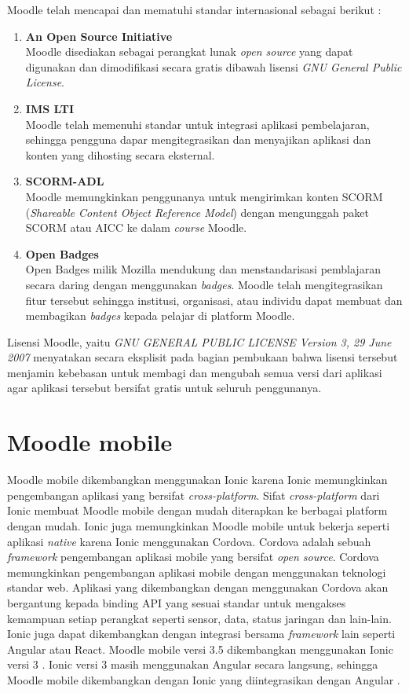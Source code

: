 Moodle telah mencapai dan mematuhi standar internasional sebagai berikut : \cite{moodle:standards}
		\begin{enumerate}
			\item \textbf{An Open Source Initiative} \\
				Moodle disediakan sebagai perangkat lunak \textit{open source} yang dapat digunakan dan dimodifikasi secara gratis dibawah lisensi \textit{GNU General Public License}.
			\item \textbf{IMS LTI\texttrademark} \\
				Moodle telah memenuhi standar untuk integrasi aplikasi pembelajaran, sehingga pengguna dapar mengitegrasikan dan menyajikan aplikasi dan konten yang dihosting secara eksternal.
			\item \textbf{SCORM-ADL} \\
				Moodle memungkinkan penggunanya untuk mengirimkan konten SCORM (\textit{Shareable Content Object Reference Model}) dengan mengunggah paket SCORM atau AICC ke dalam \textit{course} Moodle.
	
			\item \textbf{Open Badges} \\
				Open Badges milik Mozilla mendukung dan menstandarisasi pemblajaran secara daring dengan menggunakan \textit{badges}. Moodle telah mengitegrasikan fitur tersebut sehingga institusi, organisasi, atau individu dapat membuat dan membagikan \textit{badges} kepada pelajar di platform Moodle.
		\end{enumerate}

Lisensi Moodle, yaitu \textit{GNU GENERAL PUBLIC LICENSE Version 3, 29 June 2007} menyatakan secara eksplisit pada bagian pembukaan bahwa lisensi tersebut menjamin kebebasan untuk membagi dan mengubah semua versi dari aplikasi agar aplikasi tersebut bersifat gratis untuk seluruh penggunanya\cite{GNU:preamble}.
\section{Moodle mobile}
\label{sec:Moodle mobile}
Moodle mobile dikembangkan menggunakan Ionic karena Ionic memungkinkan pengembangan aplikasi yang bersifat \textit{cross-platform}\cite{Ionic:intro}. Sifat \textit{cross-platform} dari Ionic membuat Moodle mobile dengan mudah diterapkan ke berbagai platform dengan mudah. Ionic juga memungkinkan Moodle mobile untuk bekerja seperti aplikasi \textit{native} karena Ionic menggunakan Cordova. Cordova adalah sebuah \textit{framework} pengembangan aplikasi mobile yang bersifat \textit{open source}. Cordova memungkinkan pengembangan aplikasi mobile dengan menggunakan teknologi standar web. Aplikasi yang dikembangkan dengan menggunakan Cordova akan bergantung kepada binding API yang sesuai standar untuk mengakses kemampuan setiap perangkat seperti sensor, data, status jaringan dan lain-lain\cite{cordova:overview}. Ionic juga dapat dikembangkan dengan integrasi bersama \textit{framework} lain seperti Angular atau React. Moodle mobile versi 3.5 dikembangkan menggunakan Ionic versi 3 \cite{Moodlemobile:mm}. Ionic versi 3 masih menggunakan Angular secara langsung, sehingga Moodle mobile dikembangkan dengan Ionic yang diintegrasikan dengan Angular \cite{Moodlemobile:ionicangular}.

